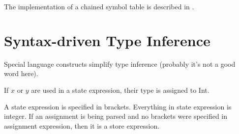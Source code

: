 The implementation of a chained symbol table is described in \cite{dragonbook}.


  \section{Syntax-driven Type Inference}
Special language constructs simplify type inference (probably it's not a good word here).

If $x$ or $y$ are used in a state expression, their type is assigned to Int.

A state expression is specified in brackets. Everything in state expression is integer.
If an assignment is being parsed and no brackets were specified in assignment expression, then it is a store expression.


